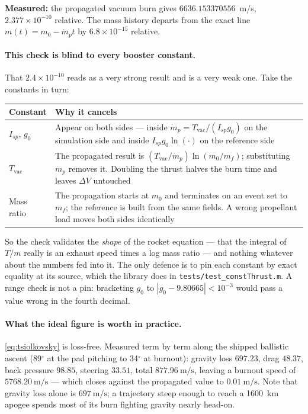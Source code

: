 \documentclass[11pt]{article}
\newcommand{\code}[1]{\texttt{#1}}
\begin{document}
\textbf{Measured:} the propagated vacuum burn gives $6636.153370556$~m/s,
$2.377\times10^{-10}$ relative. The mass history departs from the exact line
$m(t) = m_0 - \dot m_p t$ by $6.8\times10^{-15}$ relative.

\paragraph{This check is blind to every booster constant.} That
$2.4\times10^{-10}$ reads as a very strong result and is a very weak one. Take
the constants in turn:
\begin{center}\small
\begin{tabular}{@{}lp{11.2cm}@{}}
\toprule
Constant & Why it cancels \\
\midrule
$I_{sp}$, $g_0$ & Appear on both sides --- inside
  $\dot m_p = T_{\text{vac}}/(I_{sp}g_0)$ on the simulation side and inside
  $I_{sp}g_0\ln(\cdot)$ on the reference side \\
$T_{\text{vac}}$ & The propagated result is
  $(T_{\text{vac}}/\dot m_p)\ln(m_0/m_f)$; substituting $\dot m_p$ removes it.
  Doubling the thrust halves the burn time and leaves $\Delta V$ untouched \\
Mass ratio & The propagation starts at $m_0$ and terminates on an event set to
  $m_f$; the reference is built from the same fields. A wrong propellant load
  moves both sides identically \\
\bottomrule
\end{tabular}
\end{center}
So the check validates the \emph{shape} of the rocket equation --- that the
integral of $T/m$ really is an exhaust speed times a log mass ratio --- and
nothing whatever about the numbers fed into it. The only defence is to pin each
constant by exact equality at its source, which the library does in
\code{tests/test\_constThrust.m}. A range check is not a pin: bracketing $g_0$
to $|g_0 - 9.80665| < 10^{-3}$ would pass a value wrong in the fourth decimal.

\paragraph{What the ideal figure is worth in practice.} \eqref{eq:tsiolkovsky}
is loss-free. Measured term by term along the shipped ballistic ascent
(89$^\circ$ at the pad pitching to 34$^\circ$ at burnout): gravity loss
$697.23$, drag $48.37$, back pressure $98.85$, steering $33.51$, total
$877.96~\mathrm{m/s}$, leaving a burnout speed of $5768.20~\mathrm{m/s}$ ---
which closes against the propagated value to $0.01~\mathrm{m/s}$. Note that
gravity loss alone is $697~\mathrm{m/s}$; a trajectory steep enough to reach a
1600~km apogee spends most of its burn fighting gravity nearly head-on.
\end{document}
